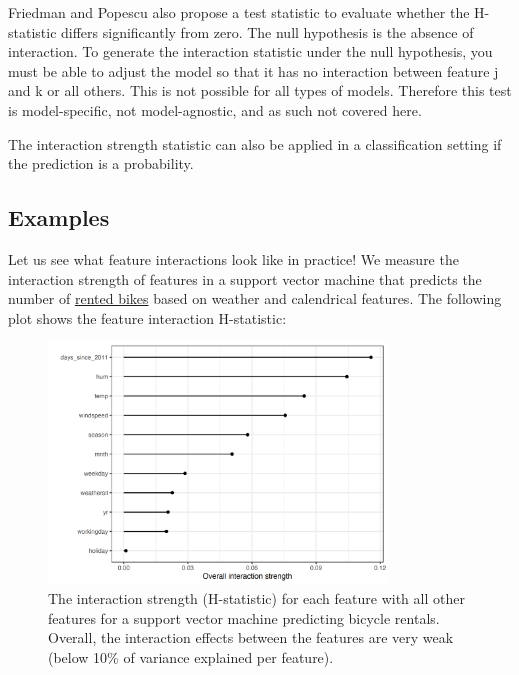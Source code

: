\documentclass[
  10pt,
]{scrbook}
\begin{document}
Friedman and Popescu also propose a test statistic to evaluate whether the H-statistic differs significantly from zero.
The null hypothesis is the absence of interaction.
To generate the interaction statistic under the null hypothesis, you must be able to adjust the model so that it has no interaction between feature j and k or all others.
This is not possible for all types of models.
Therefore this test is model-specific, not model-agnostic, and as such not covered here.

The interaction strength statistic can also be applied in a classification setting if the prediction is a probability.

\hypertarget{examples-2}{%
\subsection{Examples}\label{examples-2}}

Let us see what feature interactions look like in practice!
We measure the interaction strength of features in a support vector machine that predicts the number of \protect\hyperlink{bike-data}{rented bikes} based on weather and calendrical features.
The following plot shows the feature interaction H-statistic:

\begin{figure}

{\centering \includegraphics[width=0.8\textwidth]{images/interaction-bike-1} 

}

\caption{The interaction strength (H-statistic) for each feature with all other features for a support vector machine predicting bicycle rentals. Overall, the interaction effects between the features are very weak (below 10\% of variance explained per feature).}\label{fig:interaction-bike}
\end{figure}
\end{document}
